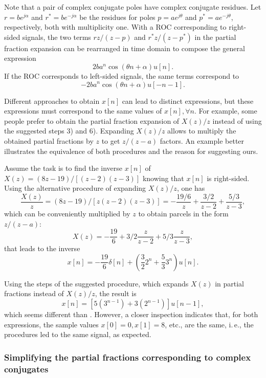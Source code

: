 Note that a pair of complex conjugate poles have complex conjugate residues. Let
$r=b e^{j\alpha}$ and $r^*=b e^{-j\alpha}$ be the residues for poles $p=a e^{j \theta}$ and $p^*=a e^{-j \theta}$, respectively, both with multiplicity one. With a ROC corresponding to right-sided signals, the two terms $rz/(z-p)$ and $r^*z/(z-p^*)$ in the partial fraction expansion can be rearranged in time domain to compose the general expression
\[
2 b a^n \cos(\theta n + \alpha) u[n].
\]
If the ROC corresponds to left-sided signals, the same terms correspond to
\[
- 2 b a^n \cos(\theta n + \alpha) u[-n-1].
\]

Different approaches to obtain $x[n]$ can lead to distinct expressions, but these expressions must correspond to the same values of $x[n], \forall n$. For example, some people prefer to obtain the partial fraction expansion of $X(z)/z$
instead of using the suggested steps 3) and 6). Expanding $X(z)/z$ allows to multiply the obtained partial fractions by $z$ to get $z/(z-a)$ factors. An example better illustrates the equivalence of both procedures and the reason for suggesting ours.

Assume the task is to find the inverse $x[n]$ of $X(z)=(8z-19)/[(z-2)(z-3)]$ knowing that $x[n]$ is right-sided.
Using the alternative procedure of expanding $X(z)/z$, one has
\[
\frac{X(z)}{z} = (8z-19)/[z(z-2)(z-3)] = -\frac{19/6}{z} + \frac{3/2}{z-2} + \frac{5/3}{z-3},
\]
which can be conveniently multiplied by $z$ to obtain parcels in the form $z/(z-a)$:
\[
X(z) = -\frac{19}{6} + 3/2 \frac{z}{z-2} + 5/3 \frac{z}{z-3},
\]
that leads to the inverse
\begin{equation}
x[n]=-\frac{19}{6}\delta[n] + \left( \frac{3}{2} 2^n + \frac{5}{3} 3^n \right) u[n].
\label{eq:example_of_inverse}
\end{equation}

Using the steps of the suggested procedure, which expands $X(z)$ in partial fractions instead of $X(z)/z$, the result is
\[
x[n]=[5 (3^{n-1}) + 3 (2^{n-1})] u[n-1],
\]
which seems different than . However, a closer inspection indicates that, for both expressions, the sample values $x[0]=0, x[1]=8$, etc., are the same, i.\,e., the procedures led to the same signal, as expected.

\subsubsection{Simplifying the partial fractions corresponding to complex conjugates}


